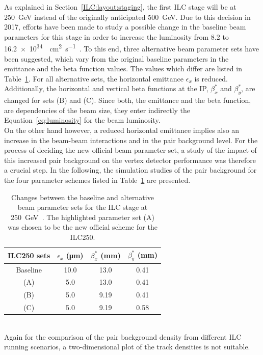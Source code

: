 As explained in Section~\ref{ILC:layout:staging}, the first ILC stage will be at \SI{250}{\GeV} instead of the originally anticipated \SI{500}{\GeV}.
Due to this decision in 2017, efforts have been made to study a possible change in the baseline beam parameters for this stage in order to increase the luminosity from \num{8.2} to \SI{16.2e34}{\per\centi\meter\squared\per\second}~\cite{LCWS17_paper}. 
To this end, three alternative beam parameter sets have been suggested, which vary from the original baseline parameters in the emittance and the beta function values.
The values which differ are listed in Table~\ref{tab:ILC250_sets}.
For all alternative sets, the horizontal emittance $\epsilon_x$ is reduced. 
Additionally, the horizontal and vertical beta functions at the IP, $\beta^*_x$ and $\beta^*_y$, are changed for sets (B) and (C).
Since both, the emittance and the beta function, are dependencies of the beam size, they enter indirectly the Equation~\ref{eq:luminosity} for the beam luminosity.
\\On the other hand however, a reduced horizontal emittance implies also an increase in the beam-beam interactions and in the pair background level.
For the process of deciding the new official beam parameter set, a study of the impact of this increased pair background on the \sid vertex detector performance was therefore a crucial step.
In the following, the simulation studies of the pair background for the four parameter schemes listed in Table~\ref{tab:ILC250_sets} are presented.
\begin{table}[h]
\caption[New ILC250 beam parameters]{Changes between the baseline and alternative beam parameter sets for the ILC stage at \SI[detect-all]{250}{\GeV}~\cite{LCWS17_paper}.
The highlighted parameter set (A) was chosen to be the new official scheme for the ILC250.}
\label{tab:ILC250_sets}
\centering
\begin{tabularx}{0.48\textwidth}{c|ccc}
\hline\hline
\textbf{ILC250 sets} & $\epsilon_x$ (\si{\micro\meter}) & $\beta^*_x$ (\si{\milli\meter}) & $\beta^*_y$ (\si{\milli\meter})\\
\hline
 Baseline & 10.0 & 13.0 & 0.41\\
\rowcolor{Gray} (A) & 5.0 & 13.0 & 0.41\\
 (B) & 5.0 & 9.19 & 0.41\\
 (C) & 5.0 & 9.19 & 0.58\\
\hline\hline
\end{tabularx}
\end{table}
\\Again for the comparison of the pair background density from different ILC running scenarios, a two-dimensional plot of the track densities is not suitable.
